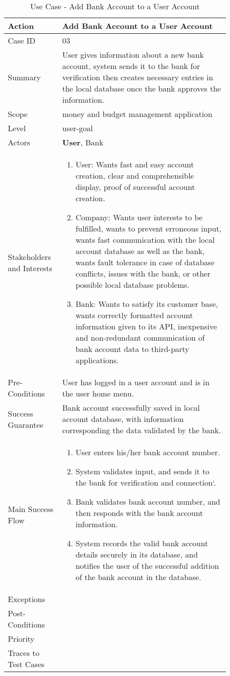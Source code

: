 \documentclass[11pt]{article}
\newcounter{use case ID}
\newcommand\tabularhead[1]{
\begin{table}[ht]
    \addtocounter{use case ID}{1}
    \caption{Use Case \arabic{use case ID} - #1}
    \vspace{0.2cm}
    \begin{tabular}{|p{0.2\linewidth}|p{0.70\linewidth}|}
    \hline
        \textbf{Action} & \textbf{#1} \\
        \hline}
\newcommand\addrow[2]{#1 & #2\\ \hline}
\newcommand\addmulrow[2]{ \begin{minipage}[t][][t]{2.5cm}#1\end{minipage}
        &\begin{minipage}[t][][t]{11cm}
        \begin{enumerate}[itemsep=-1ex] #2   \end{enumerate}
    \end{minipage}\vfill\\ \hline}
\newenvironment{usecase}{\tabularhead}
{\hline\end{tabular}\end{table}}
\begin{document}
\begin{usecase}{Add Bank Account to a User Account}
    \addrow{Case ID}{03}
    \addrow{Summary}{User gives information about a new bank account, system sends it to the bank for verification then creates necessary entries in the local database once the bank approves the information.}
    \addrow{Scope}{money and budget management application}
    \addrow{Level}{user-goal}
    \addrow{Actors}{\textbf{User}, Bank}
    \addmulrow{Stakeholders and Interests}{
        \item User: Wants fast and easy account creation, clear and comprehensible display, proof of successful account creation.
        \item Company: Wants user interests to be fulfilled, wants to prevent erroneous input, wants fast communication with the local account database as well as the bank, wants fault tolerance in case of database conflicts, issues with the bank, or other possible local database problems.
        \item Bank: Wants to satisfy its customer base, wants correctly formatted account information given to its API, inexpensive and non-redundant communication of bank account data to third-party applications.}
    \addrow{Pre-Conditions}{User has logged in a user account and is in the user home menu.}
    \addrow{Success Guarantee}{Bank account successfully saved in local account database, with information corresponding the data validated by the bank.}
    \addmulrow{Main Success Flow}{
        \item User enters his/her bank account number.
        \item System validates input, and sends it to the bank for verification and connection`.
        \item Bank validates bank account number, and then responds with the bank account information.
        \item System records the valid bank account details securely in its database, and notifies the user of the successful addition of the bank account in the database.}
    \addrow{Exceptions}{}
    \addrow{Post-Conditions}{}
    \addrow{Priority}{}
    \addrow{Traces to Test Cases}{}
\end{usecase}
\end{document}
